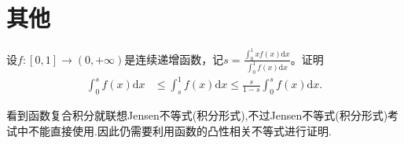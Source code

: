 \documentclass[../../main.tex]{subfiles}
\begin{document}
\section{其他}

\begin{example}
设$f:[0,1]\to(0,+\infty)$是连续递增函数，记$s = \frac{\int_{0}^{1}xf(x)\mathrm{d}x}{\int_{0}^{1}f(x)\mathrm{d}x}$。证明
\begin{align*}
\int_{0}^{s}f(x)\mathrm{d}x&\leqslant\int_{s}^{1}f(x)\mathrm{d}x\leqslant\frac{s}{1 - s}\int_{0}^{s}f(x)\mathrm{d}x.
\end{align*}
\end{example}
\begin{note}
看到函数复合积分就联想Jensen不等式(积分形式),不过Jensen不等式(积分形式)考试中不能直接使用.因此仍需要利用函数的凸性相关不等式进行证明.
\end{note}
\end{document}
